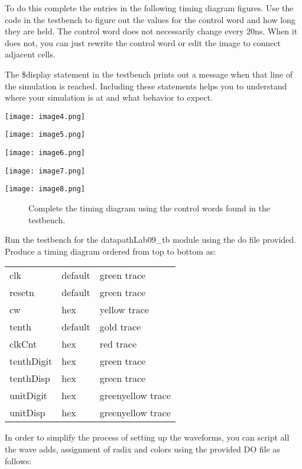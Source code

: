 To do this complete the entries in the following timing diagram figures.
Use the code in the testbench to figure out the values for the control
word and how long they are held. The control word does not necessarily
change every 20ns. When it does not, you can just rewrite the control
word or edit the image to connect adjacent cells.

The \$display statement in the testbench prints out a message when that
line of the simulation is reached. Including these statements helps you
to understand where your simulation is at and what behavior to expect.

\begin{landscape}
\texttt{[image:  image4.png]}

\texttt{[image:  image5.png]}

\texttt{[image:  image6.png]}

\texttt{[image:  image7.png]}

\texttt{[image:  image8.png]}

\begin{figure}[ht]
\caption{Complete the timing diagram using the control words found in the testbench.}
\label{figure:swDPtiming}
\end{figure}

\end{landscape}

Run the testbench for the datapathLab09\_tb module using the do file
provided. Produce a timing diagram ordered from top to bottom as:

\begin{tabular}{p{3cm}p{3cm}p{3cm}}
  clk 		& default 	& green trace \\
  resetn 		& default 	& green trace \\
  cw 		& hex 		& yellow trace \\
  tenth 		& default 	& gold trace \\
  clkCnt 		& hex 		& red trace \\
  tenthDigit 	& hex 		& green trace \\
  tenthDisp 	& hex 		& green trace \\
  unitDigit 	& hex 		& greenyellow trace \\
  unitDisp 	& hex 		& greenyellow trace \\
\end{tabular}

In order to simplify the process of setting up the waveforms, you can
script all the wave adds, assignment of radix and colors using the
provided DO file as follows:

